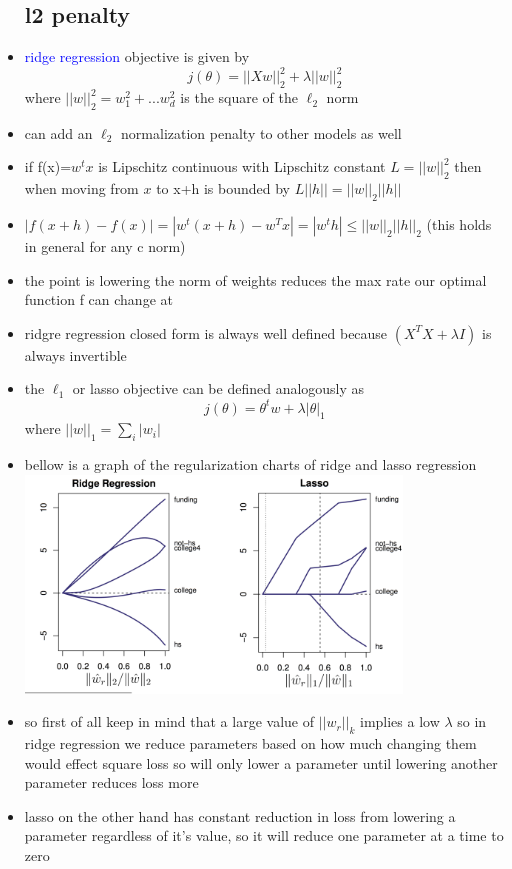 \documentclass{article}
\begin{document}
\begin{itemize}
\subsection*{l2 penalty}
\item \textcolor{blue}{ridge regression} objective is given by $$j(\theta)= ||Xw||_{2}^{2}+\lambda||w||^2_{2}$$ where $||w||_{2}^{2}=w_{1}^2+...w^2_{d}$ is the square of the $\ell_{2}$ norm 
\item can add an $\ell_{2}$ normalization penalty to other models as well
\item if f(x)=$w^tx$ is Lipschitz continuous with Lipschitz constant  $L=||w||_{2}^{2}$ then when moving from $x$ to x+h is bounded by $L||h||=||w||_{2}||h||$
\item $|f(x+h)-f(x)|=|w^t(x+h)-w^Tx|=|w^th|\leq ||w||_{2}||h||_2$ (this holds in general for any c norm)
\item the point is lowering the norm of weights reduces the max rate our optimal function f can change at 
\item ridgre regression closed form is always well defined because $(X^TX+\lambda I)$ is always invertible
\item the $\ell_{1}$ or lasso objective can be defined analogously as $$j(\theta)=\theta^{t}w+\lambda|\theta|_{1}$$ where $||w||_1=\sum_{i}|w_i|$
\item bellow is a graph of the regularization charts of ridge and lasso regression \includegraphics*[width=10cm]{images/Screenshot 2023-05-10 at 10.01.41 PM.png}
\item so first of all  keep in mind that a large value of  $||w_r||_{k}$ implies a low $\lambda$ so in ridge regression we reduce parameters based on how much changing them would effect square loss so will only lower a parameter until lowering another parameter reduces loss more 
\item lasso on the other hand has constant reduction in loss from lowering a parameter regardless of it's value, so it will reduce one parameter at a time to zero 

\end{itemize}
\end{document}
